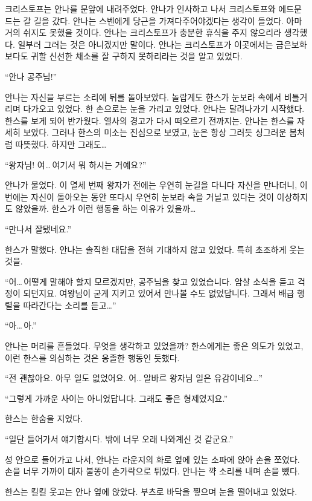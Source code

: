 \textbreak

크리스토프는 안나를 문앞에 내려주었다. 안나가 인사하고 나서 크리스토프와 에드문드는 갈 길을 갔다. 안나는 스벤에게 당근을 가져다주어야겠다는 생각이 들었다. 아마 거의 쉬지도 못했을 것이다. 안나는 크리스토프가 충분한 휴식을 주지 않으리라 생각했다. 일부러 그러는 것은 아니겠지만 말이다. 안나는 크리스토프가 이곳에서는 금은보화보다도 귀할 신선한 채소를 잘 구하지 못하리라는 것을 알고 있었다.

``안나 공주님!''

안나는 자신을 부르는 소리에 뒤를 돌아보았다. 놀랍게도 한스가 눈보라 속에서 비틀거리며 다가오고 있었다. 한 손으로는 눈을 가리고 있었다. 안나는 달려나가기 시작했다. 한스를 보게 되어 반가웠다. 엘사의 경고가 다시 떠오르기 전까지는. 안나는 한스를 자세히 보았다. 그러나 한스의 미소는 진심으로 보였고, 눈은 항상 그러듯 싱그러운 봄처럼 따뜻했다. 하지만 그래도\ldots

``왕자님! 여\ldots\,여기서 뭐 하시는 거예요?''

안나가 물었다. 이 열세 번째 왕자가 전에는 우연히 눈길을 다니다 자신을 만나더니, 이번에는 자신이 돌아오는 동안 또다시 우연히 눈보라 속을 거닐고 있다는 것이 이상하지도 않았을까. 한스가 이런 행동을 하는 이유가 있을까\ldots

``만나서 잘됐네요.''

한스가 말했다. 안나는 솔직한 대답을 전혀 기대하지 않고 있었다. 특히 초조하게 웃는 것을.

``어\ldots\,어떻게 말해야 할지 모르겠지만, 공주님을 찾고 있었습니다. 암살 소식을 듣고 걱정이 되던지요. 여왕님이 굳게 지키고 있어서 만나볼 수도 없었답니다. 그래서 배급 행렬을 따라간다는 소리를 듣고\ldots''

``아\ldots\,아.''

안나는 머리를 흔들었다. 무엇을 생각하고 있었을까? 한스에게는 좋은 의도가 있었고, 이런 한스를 의심하는 것은 옹졸한 행동인 듯했다.

``전 괜찮아요. 아무 일도 없었어요. 어\ldots\,알바르 왕자님 일은 유감이네요\ldots''

``그렇게 가까운 사이는 아니었답니다. 그래도 좋은 형제였지요.''

한스는 한숨을 지었다.

``일단 들어가서 얘기합시다. 밖에 너무 오래 나와계신 것 같군요.''

성 안으로 들어가고 나서, 안나는 라운지의 화로 옆에 있는 소파에 앉아 손을 쪼였다. 손을 너무 가까이 대자 불똥이 손가락으로 튀었다. 안나는 꺅 소리를 내며 손을 뺐다.

한스는 킬킬 웃고는 안나 옆에 앉았다. 부츠로 바닥을 찧으며 눈을 떨어내고 있었다.

